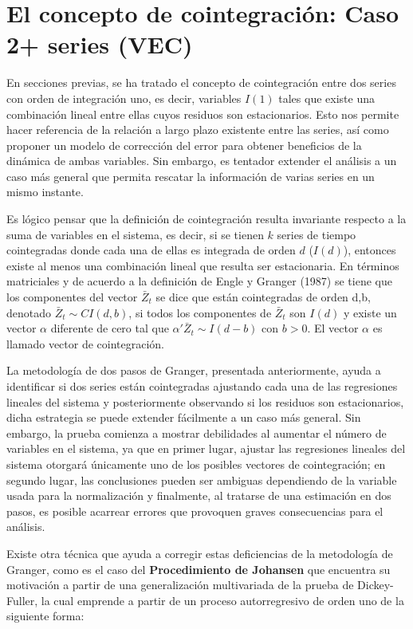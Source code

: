 

\section{El concepto de cointegración: Caso 2+ series (VEC)}

En secciones previas, se ha tratado el concepto de cointegración entre dos series  con orden de integración uno, es decir, variables $I(1)$ tales que existe una combinación lineal entre ellas cuyos residuos son estacionarios. Esto nos permite hacer referencia de la relación a largo plazo  existente entre las series, así como proponer un modelo de corrección del error para obtener beneficios de la dinámica de ambas variables. Sin embargo, es tentador  extender el análisis a un caso más general que permita rescatar la información de varias series en un mismo instante. \bigskip 

Es lógico pensar que la definición de cointegración resulta invariante respecto a la suma de variables en el sistema, es decir, si se tienen $k$ series de tiempo cointegradas donde cada una de ellas es integrada de orden $d$ ($I(d)$), entonces existe al menos una combinación lineal que resulta ser estacionaria. En términos matriciales y de acuerdo a la definición de Engle y Granger (1987) se tiene que los componentes del vector $\bar{Z}_t$ se dice que están cointegradas de orden d,b, denotado $\bar{Z}_t \sim CI(d,b)$, si todos los componentes de $\bar{Z}_t$ son $I(d)$ y existe un vector $\alpha$ diferente de cero tal que $ \alpha'\bar{Z}_t \sim I(d-b)$ con $b>0$. El vector $\alpha$ es llamado vector de cointegración. \bigskip 


La metodología de dos pasos de Granger, presentada anteriormente, ayuda a identificar si dos series están cointegradas ajustando cada una de las regresiones lineales del sistema y posteriormente observando si los residuos son estacionarios, dicha estrategia se puede extender fácilmente a un caso más general. Sin embargo, la prueba comienza a mostrar debilidades al aumentar el número de variables en el sistema, ya que en primer lugar, ajustar las regresiones lineales del sistema otorgará únicamente uno de los posibles vectores de cointegración; en segundo lugar, las conclusiones pueden ser ambiguas dependiendo de la variable usada para la normalización y finalmente, al tratarse de una estimación en dos pasos, es posible acarrear errores que provoquen graves consecuencias para el análisis.\bigskip 

Existe otra técnica que ayuda a corregir estas deficiencias de la metodología de Granger, como es el caso del \textbf{Procedimiento de Johansen} que encuentra su motivación a partir de una generalización multivariada de la prueba de Dickey-Fuller, la cual emprende a partir de un proceso autorregresivo de orden uno de la siguiente forma:

